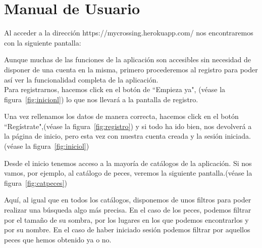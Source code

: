 \chapter{Manual de Usuario}\label{manual}

Al acceder a la dirección https://mycrossing.herokuapp.com/ nos encontraremos con la siguiente pantalla:\\


Aunque muchas de las funciones de la aplicación son accesibles sin necesidad de disponer de una cuenta en la misma, primero procederemos al registro para poder así ver la funcionalidad completa de la aplicación.\\

Para registrarnos, hacemos click en el botón de ``Empieza ya", {(v\'ease la figura~\ref{fig:inicionl})} lo que nos llevará a la pantalla de registro.\\

\clearpage


Una vez rellenamos los datos de manera correcta, hacemos click en el botón ``Regístrate",{(v\'ease la figura~\ref{fig:registro})} y si todo ha ido bien, nos devolverá a la página de inicio, pero esta vez con nuestra cuenta creada y la sesión iniciada.{(v\'ease la figura~\ref{fig:iniciol})}\\


\clearpage

Desde el inicio tenemos acceso a la mayoría de catálogos de la aplicación. Si nos vamos, por ejemplo, al catálogo de peces, veremos la siguiente pantalla.{(v\'ease la figura~\ref{fig:catpeces})}\\


Aquí, al igual que en todos los catálogos, disponemos de unos filtros para poder realizar una búsqueda algo más precisa. En el caso de los peces, podemos filtrar por el tamaño de su sombra, por los lugares en los que podemos encontrarlos y por su nombre. En el caso de haber iniciado sesión podemos filtrar por aquellos peces que hemos obtenido ya o no.\\

